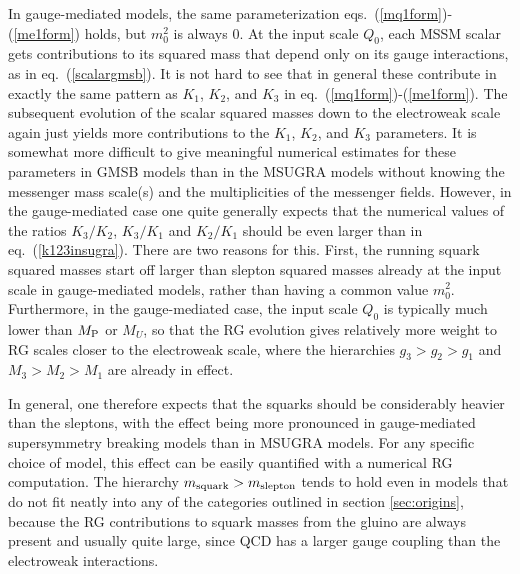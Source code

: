 \documentclass[11pt]{article}
\def\MPlanck{M_{\rm P}}
\begin{document}
In gauge-mediated models, the same parameterization 
eqs.~(\ref{mq1form})-(\ref{me1form}) holds, but $m_0^2$ is always 0. At 
the input scale $Q_0$, each MSSM scalar gets contributions to its squared 
mass that depend only on its gauge interactions, as in 
eq.~(\ref{scalargmsb}). It is not hard to see that in general these 
contribute in exactly the same pattern as $K_1$, $K_2$, and $K_3$ in 
eq.~(\ref{mq1form})-(\ref{me1form}). The subsequent evolution of the 
scalar squared masses down to the electroweak scale again just yields more 
contributions to the $K_1$, $K_2$, and $K_3$ parameters. It is somewhat 
more difficult to give meaningful numerical estimates for these parameters 
in GMSB models than in the MSUGRA models without 
knowing the messenger mass scale(s) and the multiplicities of the 
messenger fields. However, in the gauge-mediated case one quite generally 
expects that the numerical values of the ratios $K_3/K_2$, $K_3/K_1$ and 
$K_2/K_1$ should be even larger than in eq.~(\ref{k123insugra}). There are 
two reasons for this. First, the running squark squared masses start off 
larger than slepton squared masses already at the input scale in 
gauge-mediated models, rather than having a common value $m_0^2$. 
Furthermore, in the gauge-mediated case, the input scale $Q_0$ is 
typically much lower than $\MPlanck$ or $M_U$, so that the RG evolution 
gives 
relatively more weight to RG scales closer to the electroweak scale, where 
the hierarchies $g_3>g_2>g_1$ and $M_3>M_2>M_1$ are already in effect.

In general, one therefore expects that the squarks should be considerably 
heavier than the sleptons, with the effect being more pronounced in 
gauge-mediated supersymmetry breaking models than in MSUGRA 
models. For any specific choice of model, this effect can be easily 
quantified with a numerical RG computation. 
The hierarchy $m_{\rm squark} > m_{\rm 
slepton}$ tends to hold even in models that do not fit neatly into any of 
the categories outlined in section \ref{sec:origins}, because the RG 
contributions to squark masses from the gluino are always present and 
usually quite large, since QCD has a larger gauge coupling than the 
electroweak interactions.
\end{document}

